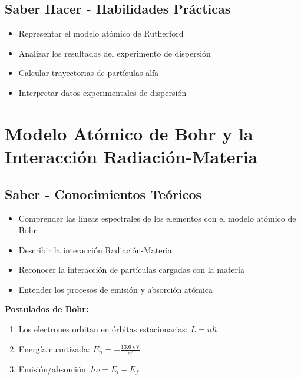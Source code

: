 \documentclass[12pt,a4paper,twoside]{book}
\begin{document}
	\subsection{Saber Hacer - Habilidades Prácticas}
	\begin{hacerbox}
		\begin{itemize}
			\item Representar el modelo atómico de Rutherford
			\item Analizar los resultados del experimento de dispersión
			\item Calcular trayectorias de partículas alfa
			\item Interpretar datos experimentales de dispersión
		\end{itemize}
	\end{hacerbox}
	
	\section{Modelo Atómico de Bohr y la Interacción Radiación-Materia}
	\label{sec:modelo_bohr}
	
	\subsection{Saber - Conocimientos Teóricos}
	\begin{saberbox}
		\begin{itemize}
			\item Comprender las líneas espectrales de los elementos con el modelo atómico de Bohr
			\item Describir la interacción Radiación-Materia
			\item Reconocer la interacción de partículas cargadas con la materia
			\item Entender los procesos de emisión y absorción atómica
		\end{itemize}
	\end{saberbox}
	
	\begin{ecuacionbox}
		\textbf{Postulados de Bohr:}
		\begin{enumerate}
			\item Los electrones orbitan en órbitas estacionarias: $L = n\hbar$
			\item Energía cuantizada: $E_n = -\frac{13.6 \text{ eV}}{n^2}$
			\item Emisión/absorción: $h\nu = E_i - E_f$
		\end{enumerate}
	\end{ecuacionbox}
	
\end{document}
